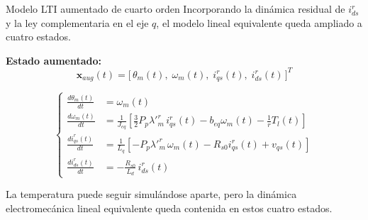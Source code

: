 \documentclass[aspectratio=169,t]{beamer}
\begin{document}
\begin{frame}{Modelo LTI aumentado de cuarto orden}
{\small\color{uncGray}Incorporando la dinámica residual de $i_{ds}^{r}$ y la ley complementaria en el eje $q$, el modelo lineal equivalente queda ampliado a cuatro estados.}\par
\vspace{2mm}

\textbf{Estado aumentado:}
\begin{equation*}
\bm{x}_{aug}(t)=\big[\,\theta_m(t),\;\omega_m(t),\;i_{qs}^r(t),\;i_{ds}^{r}(t)\,\big]^T
\end{equation*}

\footnotesize
\begin{equation*}
\left\{
\begin{aligned}
\frac{d\theta_m(t)}{dt} &= \omega_m(t) \\[2pt]
\frac{d\omega_m(t)}{dt} &= \frac{1}{J_{eq}}\!\left[\frac{3}{2}P_p\lambda'^r_m\,i_{qs}^r(t)-b_{eq}\omega_m(t)-\frac{1}{r}T_l(t)\right] \\[4pt]
\frac{di_{qs}^r(t)}{dt} &= \frac{1}{L_q}\!\left[-P_p\lambda'^r_m\,\omega_m(t)-R_{s0}i_{qs}^r(t)+v_{qs}(t)\right] \\[4pt]
\frac{di_{ds}^{r}(t)}{dt} &= -\frac{R_{s0}}{L_d}\,i_{ds}^{r}(t)
\end{aligned}
\right.
\end{equation*}
\normalsize

{\small La temperatura puede seguir simulándose aparte, pero la dinámica electromecánica lineal equivalente queda contenida en estos cuatro estados.}
\end{frame}
\end{document}
